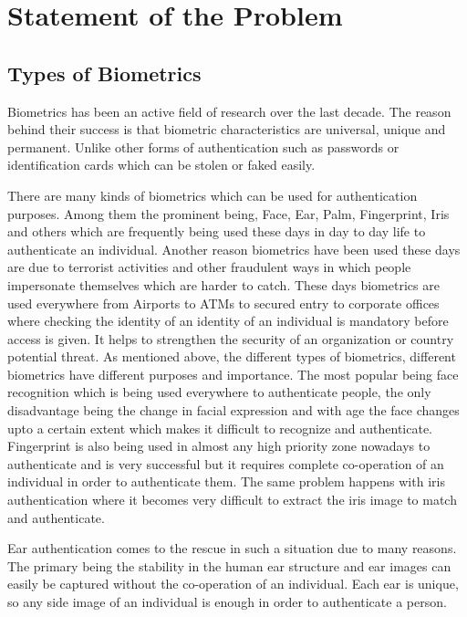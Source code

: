 \chapter{Statement of the Problem}
\label{sec:problem}

\section{Types of Biometrics} Biometrics has been an active field of research over the last decade. The reason behind their success is that biometric characteristics are universal, unique and permanent. Unlike other forms of authentication such as passwords or identification cards which can be stolen or faked easily.

There are many kinds of biometrics which can be used for authentication purposes. Among them the prominent being, Face, Ear, Palm, Fingerprint, Iris and others which are frequently being used these days in day to day life to authenticate an individual. Another reason biometrics have been used these days are due to terrorist activities and other fraudulent ways in which people impersonate themselves which are harder to catch. These days biometrics are used everywhere from Airports to ATMs to secured entry to corporate offices where checking the identity of an identity of an individual is mandatory before access is given. It helps to strengthen the security of an organization or country potential threat. As mentioned above, the different types of biometrics, different biometrics have different purposes and importance. The most popular being face recognition which is being used everywhere to authenticate people, the only disadvantage being the change in facial expression and with age the face changes upto a certain extent which makes it difficult to recognize and authenticate. Fingerprint is also being used in almost any high priority zone nowadays to authenticate and is very successful but it requires complete co-operation of an individual in order to authenticate them. The same problem happens with iris authentication where it becomes very difficult to extract the iris image to match and authenticate. 

Ear authentication comes to the rescue in such a situation due to many reasons. The primary being the stability in the human ear structure and ear images can easily be captured without the co-operation of an individual. Each ear is unique, so any side image of an individual is enough in order to authenticate a person.

